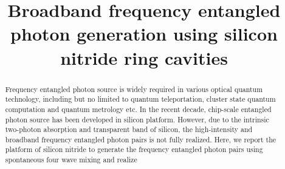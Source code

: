 \documentclass[final]{kuee_en}
\title{Broadband frequency entangled photon generation using silicon nitride ring cavities}
\author{\cjk{殷　政浩}}
\date{\cjk{令和2年2月1日}}
\begin{document}
\maketitle

\begin{abstract}
Frequency entangled photon source is widely required in various optical quantum technology, including but no limited to quantum teleportation, cluster state quantum computation and quantum metrology etc. In the recent decade, chip-scale entangled photon source has been developed in silicon platform. However, due to the intrinsic two-photon absorption and transparent band of silicon, the high-intensity and broadband frequency entangled photon pairs is not fully realized. Here, we report the platform of silicon nitride to generate the frequency entangled photon pairs using spontaneous four wave mixing and realize 


\end{abstract}

\tableofcontents












\begin{acknowledgements}
\lipsum[2-4]
\end{acknowledgements}


\printbibliography[title=References,heading=bibintoc]

\clearpage %
\processdelayedfloats
\clearpage

\end{document}
